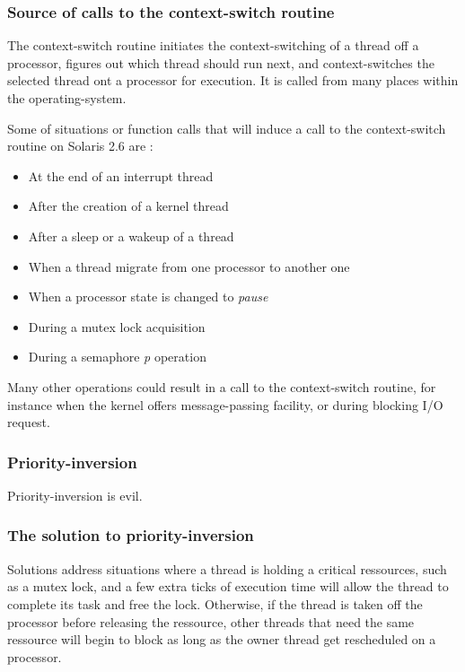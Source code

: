 \begin{frame}
\frametitle{Source of calls to the context-switch routine}

The context-switch routine initiates the context-switching of a thread off a processor, figures out which thread should run next, and context-switches the selected thread ont a processor for execution. It is called from many places within the operating-system.

\-

Some of situations or function calls that will induce a call to the context-switch routine on Solaris 2.6 are :

\begin{itemize}
\item
At the end of an interrupt thread
\item
After the creation of a kernel thread
\item
After a sleep or a wakeup of a thread
\item
When a thread migrate from one processor to another one
\item
When a processor state is changed to \textit{pause}
\item
During a mutex lock acquisition
\item
During a semaphore \textit{p} operation
\end{itemize}

\-

Many other operations could result in a call to the context-switch routine, for instance when the kernel offers message-passing facility, or during blocking I/O request.

\end{frame}


\begin{frame}
\frametitle{Priority-inversion}


Priority-inversion is evil.

\end{frame}


\begin{frame}
\frametitle{The solution to priority-inversion}

Solutions address situations where a thread is holding a critical ressources, such as a mutex lock, and a few extra ticks of execution time will allow the thread to complete its task and free the lock. Otherwise, if the thread is taken off the processor before releasing the ressource, other threads that need the same ressource will begin to block as long as the owner thread get rescheduled on a processor.

\end{frame}


